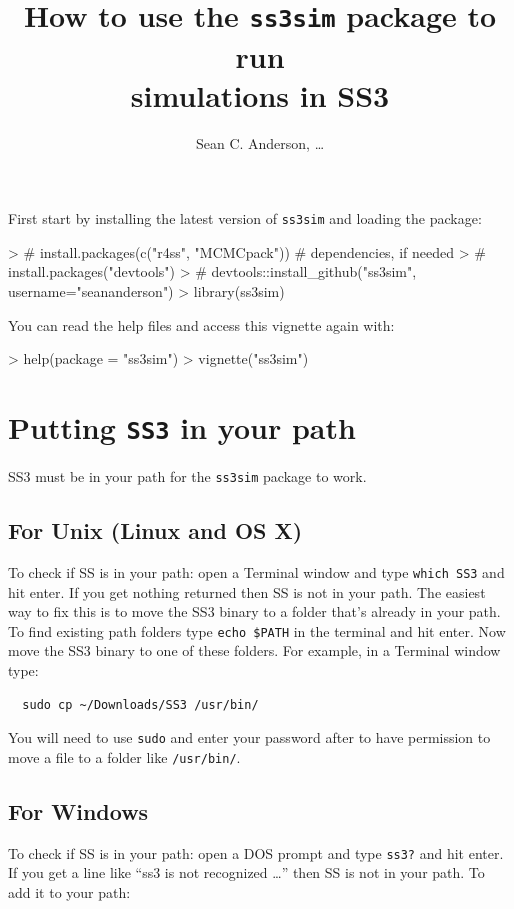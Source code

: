 \documentclass[12pt]{article}
\title{How to use the \texttt{ss3sim} package to run\\simulations in SS3}
\author{Sean C. Anderson, \ldots}
\date{}
\begin{document}
\maketitle

\noindent
First start by installing the latest version of \texttt{ss3sim} and loading the 
package:

\begin{Schunk}
\begin{Sinput}
> # install.packages(c("r4ss", "MCMCpack")) # dependencies, if needed
> # install.packages("devtools")
> # devtools::install_github("ss3sim", username="seananderson")
> library(ss3sim)
\end{Sinput}
\end{Schunk}

\noindent
You can read the help files and access this vignette again with:

\begin{Schunk}
\begin{Sinput}
> help(package = "ss3sim")
> vignette("ss3sim")
\end{Sinput}
\end{Schunk}

\section*{Putting \texttt{SS3} in your path}
SS3 must be in your path for the \texttt{ss3sim} package to work.

\subsection*{For Unix (Linux and OS X)}
To check if SS is in your path: open a Terminal window and type \texttt{which 
  SS3} and hit enter. If you get nothing returned then SS is not in your path.
The easiest way to fix this is to move the SS3 binary to a folder that's 
already in your path. To find existing path folders type \texttt{echo \$PATH} 
in the terminal and hit enter. Now move the SS3 binary to one of these folders. 
For example, in a Terminal window type:

\begin{verbatim}
  sudo cp ~/Downloads/SS3 /usr/bin/
\end{verbatim}

\noindent
You will need to use \texttt{sudo} and enter your password after to have 
permission to move a file to a folder like \texttt{/usr/bin/}.

\subsection*{For Windows}
To check if SS is in your path: open a DOS prompt and type \texttt{ss3?} and 
hit enter. If you get a line like ``ss3 is not recognized \ldots'' then SS is 
not in your path. To add it to your path:
\end{document}
